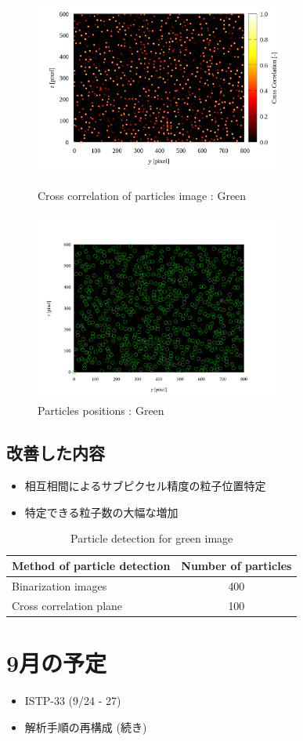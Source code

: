 \documentclass[twocolumn,a4j]{jsarticle}
\begin{document}
\begin{figure}[htbp]
  \includegraphics[keepaspectratio, width=82mm]{../images/cross_crr_particle.png}
  \caption{Cross correlation of particles image : Green}
  \includegraphics[keepaspectratio, width=82mm]{../images/particle_positions_green.png}
  \caption{Particles positions : Green}
\end{figure}

\subsection{改善した内容}
\begin{itemize}
  \item 相互相間によるサブピクセル精度の粒子位置特定
  \item 特定できる粒子数の大幅な増加
\end{itemize}

\begin{table}[hbtp]
  \centering
  \caption{Particle detection for green image}
  \begin{tabular}{l c}
    \hline
    Method of particle detection & Number of particles \\ \hline \hline
    Binarization images          & 400                 \\ \hline
    Cross correlation plane      & 100                 \\ \hline
  \end{tabular}
\end{table}



\section{9月の予定}
\begin{itemize}
  \item ISTP-33 (9/24 - 27)
  \item 解析手順の再構成 (続き)
\end{itemize}
\end{document}
